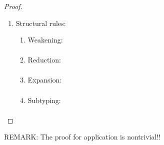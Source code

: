 \begin{lemma}
\begin{proof}
{\begin{enumerate}
\begin{enumerate}
                INCOMPLETE!! POSSIBLY IMPOSSIBLE!!!

            \end{enumerate}
            \item Structural rules:
            \begin{enumerate}
                \item Weakening:
                $$
                \begin{array}{l|l}
                \end{array}
                $$

                \item Reduction:
                $$
                \begin{array}{l|l}
                \end{array}
                $$

                \item Expansion:
                $$
                \begin{array}{l|l}
                \end{array}
                $$

                \item Subtyping:
                $$
                \begin{array}{l|l}
                \end{array}
                $$

            \end{enumerate}
        \end{enumerate}
        }
    \end{proof}
\end{lemma}


REMARK: The proof for application is nontrivial!!


